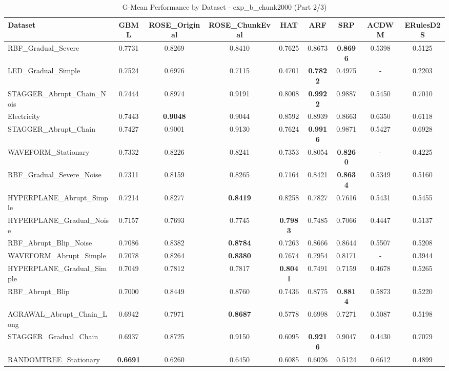 \begin{table}[htbp]
\centering
\caption{G-Mean Performance by Dataset - exp_b_chunk2000 (Part 2/3)}
\label{tab:gmean_exp_b_chunk2000_2}
\footnotesize
\begin{tabular}{lcccccccc}
\toprule
Dataset & GBML & ROSE_Original & ROSE_ChunkEval & HAT & ARF & SRP & ACDWM & ERulesD2S \\
\midrule
RBF_Gradual_Severe & 0.7731 & 0.8269 & 0.8410 & 0.7625 & 0.8673 & \textbf{0.8696} & 0.5398 & 0.5125 \\
LED_Gradual_Simple & 0.7524 & 0.6976 & 0.7115 & 0.4701 & \textbf{0.7822} & 0.4975 & - & 0.2203 \\
STAGGER_Abrupt_Chain_Nois & 0.7444 & 0.8974 & 0.9191 & 0.8008 & \textbf{0.9922} & 0.9887 & 0.5450 & 0.7010 \\
Electricity & 0.7443 & \textbf{0.9048} & 0.9044 & 0.8592 & 0.8939 & 0.8663 & 0.6350 & 0.6118 \\
STAGGER_Abrupt_Chain & 0.7427 & 0.9001 & 0.9130 & 0.7624 & \textbf{0.9916} & 0.9871 & 0.5427 & 0.6928 \\
WAVEFORM_Stationary & 0.7332 & 0.8226 & 0.8241 & 0.7353 & 0.8054 & \textbf{0.8260} & - & 0.4225 \\
RBF_Gradual_Severe_Noise & 0.7311 & 0.8159 & 0.8265 & 0.7164 & 0.8421 & \textbf{0.8634} & 0.5349 & 0.5160 \\
HYPERPLANE_Abrupt_Simple & 0.7214 & 0.8277 & \textbf{0.8419} & 0.8258 & 0.7827 & 0.7616 & 0.5431 & 0.5455 \\
HYPERPLANE_Gradual_Noise & 0.7157 & 0.7693 & 0.7745 & \textbf{0.7983} & 0.7485 & 0.7066 & 0.4447 & 0.5137 \\
RBF_Abrupt_Blip_Noise & 0.7086 & 0.8382 & \textbf{0.8784} & 0.7263 & 0.8666 & 0.8644 & 0.5507 & 0.5208 \\
WAVEFORM_Abrupt_Simple & 0.7078 & 0.8264 & \textbf{0.8380} & 0.7674 & 0.7954 & 0.8171 & - & 0.3944 \\
HYPERPLANE_Gradual_Simple & 0.7049 & 0.7812 & 0.7817 & \textbf{0.8041} & 0.7491 & 0.7159 & 0.4678 & 0.5265 \\
RBF_Abrupt_Blip & 0.7000 & 0.8449 & 0.8760 & 0.7436 & 0.8775 & \textbf{0.8814} & 0.5873 & 0.5220 \\
AGRAWAL_Abrupt_Chain_Long & 0.6942 & 0.7971 & \textbf{0.8687} & 0.5778 & 0.6998 & 0.7271 & 0.5087 & 0.5198 \\
STAGGER_Gradual_Chain & 0.6937 & 0.8725 & 0.9150 & 0.6095 & \textbf{0.9216} & 0.9047 & 0.4430 & 0.7079 \\
RANDOMTREE_Stationary & \textbf{0.6691} & 0.6260 & 0.6450 & 0.6085 & 0.6026 & 0.5124 & 0.6612 & 0.4899 \\

\end{tabular}
\end{table}
